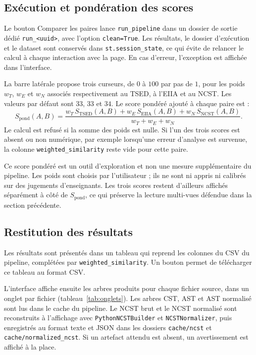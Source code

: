 \documentclass[12pt,a4paper,oneside]{report}
\begin{document}
\subsection{Exécution et pondération des scores}

Le bouton \og Comparer les paires \fg{} lance \texttt{run\_pipeline} dans un
dossier de sortie dédié \texttt{run\_<uuid>}, avec l'option \texttt{clean=True}.
Les résultats, le dossier d'exécution et le dataset sont conservés dans
\texttt{st.session\_state}, ce qui évite de relancer le calcul à chaque
interaction avec la page. En cas d'erreur, l'exception est affichée dans
l'interface.

La barre latérale propose trois curseurs, de $0$ à $100$ par pas de $1$, pour
les poids $w_T$, $w_E$ et $w_N$ associés respectivement au TSED, à l'EIIA et au
NCST. Les valeurs par défaut sont $33$, $33$ et $34$. Le score pondéré ajouté
à chaque paire est :
\begin{equation}
S_{\mathrm{pond}}(A,B) = \frac{w_T\, S_{\mathrm{TSED}}(A,B) + w_E\,
S_{\mathrm{EIIA}}(A,B) + w_N\, S_{\mathrm{NCST}}(A,B)}{w_T + w_E + w_N}.
\end{equation}
Le calcul est refusé si la somme des poids est nulle. Si l'un des trois scores
est absent ou non numérique, par exemple lorsqu'une erreur d'analyse est
survenue, la colonne \texttt{weighted\_similarity} reste vide pour cette paire.

Ce score pondéré est un outil d'exploration et non une mesure supplémentaire
du pipeline. Les poids sont choisis par l'utilisateur ; ils ne sont ni appris
ni calibrés sur des jugements d'enseignants. Les trois scores restent
d'ailleurs affichés séparément à côté de $S_{\mathrm{pond}}$, ce qui préserve
la lecture multi-vues défendue dans la section précédente.

\subsection{Restitution des résultats}

Les résultats sont présentés dans un tableau qui reprend les colonnes du CSV du
pipeline, complétées par \texttt{weighted\_similarity}. Un bouton permet de
télécharger ce tableau au format CSV.

L'interface affiche ensuite les arbres produits pour chaque fichier source,
dans un onglet par fichier (tableau~\ref{tab:onglets}). Les arbres CST, AST et
AST normalisé sont lus dans le cache du pipeline. Le NCST brut et le NCST
normalisé sont reconstruits à l'affichage avec \texttt{PythonNCSTBuilder} et
\texttt{NCSTNormalizer}, puis enregistrés au format texte et JSON dans les
dossiers \texttt{cache/ncst} et \texttt{cache/normalized\_ncst}. Si un artefact
attendu est absent, un avertissement est affiché à la place.
\end{document}
